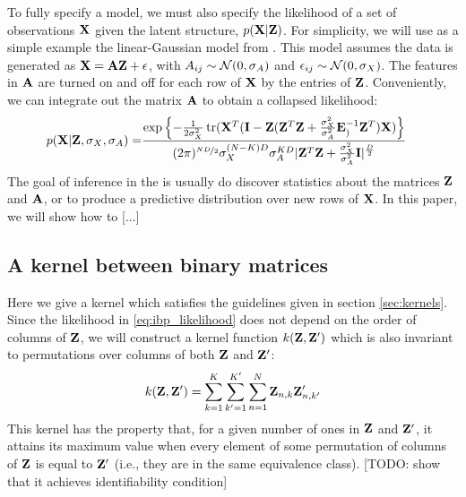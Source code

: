 To fully specify a model, we must also specify the likelihood of a set of observations $\mathbf{X}$ given the latent structure, $p(\mathbf{X}|\mathbf{Z})$.
For simplicity, we will use as a simple example the linear-Gaussian model from \cite{griffiths2005infinite}.  This model assumes the data is generated as $\mathbf{X} = {\bf{A}} \mathbf{Z} + {\bf{\epsilon}}$, with $A_{ij} \sim \mathcal{N}\!\left(0,\sigma_A\right)$ and ${\bf{\epsilon}}_{ij} \sim \mathcal{N}\!\left(0,\sigma_X\right)$.  The features in ${\bf{A}}$ are turned on and off for each row of $\mathbf{X}$ by the entries of $\mathbf{Z}$.   Conveniently, we can integrate out the matrix ${\bf{A}}$ to obtain a collapsed likelihood:
\begin{align}
p(\mathbf{X} | \mathbf{Z}, \sigma_X, \sigma_A) = & \frac{\exp \left\{ - \frac{1}{2\sigma^2_X} \operatorname{tr} ( \mathbf{X}^T ( \mathbf{I} - \mathbf{Z} ( \mathbf{Z}^T \mathbf{Z} + \frac{\sigma^2_X}{\sigma^2_A} \mathbf{E}_{)}^{-1} \mathbf{Z}^T ) \mathbf{X} ) \right\}}{(2\pi)^{\nicefrac{ND}{2}} \sigma_X^{(N-K)D} \sigma_A^{KD} | \mathbf{Z}^T \mathbf{Z} + \frac{\sigma_X^2}{\sigma_A^2} \mathbf{I} |^\frac{D}{2}}
\label{eq:ibp_likelihood}
\end{align}
%
The goal of inference in the \ibp{} is usually do discover statistics about the matrices $\mathbf{Z}$ and ${\bf{A}}$, or to produce a predictive distribution over new rows of $\mathbf{X}$.  In this paper, we will show how to [...]

\subsection{A kernel between binary matrices}

Here we give a kernel which satisfies the guidelines given in section \ref{sec:kernels}.  %
%
%
Since the likelihood in \eqref{eq:ibp_likelihood} does not depend on the order of columns of $\mathbf{Z}$, we will construct a kernel function $k(\mathbf{Z}, \mathbf{Z}')$ which is also invariant to permutations over columns of both $\mathbf{Z}$ and $\mathbf{Z}'$:
%
\begin{align}
k(\mathbf{Z}, \mathbf{Z}') 
 =  \sum_{k=1}^{K} \sum_{k'=1}^{K'} \sum_{n=1}^N \mathbf{Z}_{n,k} \mathbf{Z}'_{n,k'} 
\label{eq:IBP_kernel1}
\end{align}
%
This kernel has the property that, for a given number of ones in $\mathbf{Z}$ and $\mathbf{Z}'$, it attains its maximum value when every element of some permutation of columns of $\mathbf{Z}$ is equal to $\mathbf{Z}'$ (i.e., they are in the same equivalence class).  [TODO: show that it achieves identifiability condition]

